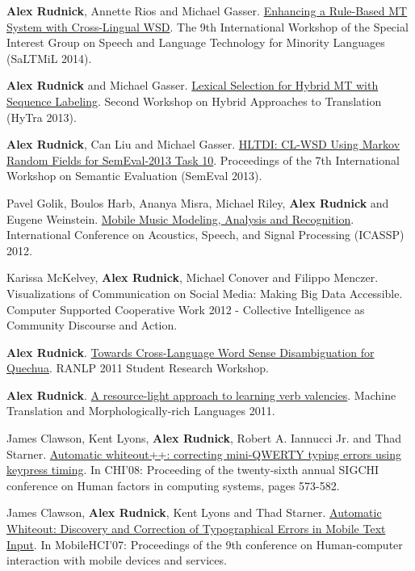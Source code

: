 \begin{itemize*}
\item
\textbf{Alex Rudnick}, Annette Rios and Michael Gasser.
\href{http://www.lrec-conf.org/proceedings/lrec2014/workshops/LREC2014Workshop-SALTMIL\%20Proceedings.pdf}
{Enhancing a Rule-Based MT System with Cross-Lingual WSD}.
The 9th International Workshop of the Special Interest Group on Speech and
Language Technology for Minority Languages (SaLTMiL 2014).

\item
\textbf{Alex Rudnick} and Michael Gasser.
\href{http://www.aclweb.org/anthology/W/W13/W13-2815.pdf}
{Lexical Selection for Hybrid MT with Sequence Labeling}.
Second Workshop on Hybrid Approaches to Translation (HyTra 2013).

\item
\textbf{Alex Rudnick}, Can Liu and Michael Gasser.
\href{http://www.aclweb.org/anthology/S/S13/S13-2031.pdf}
{HLTDI: CL-WSD Using Markov Random Fields for SemEval-2013 Task 10}.
Proceedings of the 7th International Workshop on Semantic Evaluation
(SemEval 2013).

\item
Pavel Golik, Boulos Harb, Ananya Misra, Michael Riley, \textbf{Alex Rudnick}
and Eugene Weinstein.
\href{http://research.google.com/pubs/pub37754.html}
{Mobile Music Modeling, Analysis and Recognition}.
International Conference on Acoustics, Speech, and Signal Processing (ICASSP)
2012.

\item
Karissa McKelvey, \textbf{Alex Rudnick}, Michael Conover and Filippo Menczer.
Visualizations of Communication on Social Media: Making Big Data Accessible.
Computer Supported Cooperative Work 2012 - Collective
Intelligence as Community Discourse and Action.

\item \textbf{Alex Rudnick}.
\href{http://aclweb.org/anthology-new/R/R11/R11-2021.pdf}
{Towards Cross-Language Word Sense Disambiguation for Quechua}.
RANLP 2011 Student Research Workshop.

\item
\textbf{Alex Rudnick}.
\href{http://www.mt-archive.info/MTMRL-2011-Rudnick.pdf}
{A resource-light approach to learning verb valencies}.
Machine Translation and Morphologically-rich Languages 2011.

\item
James Clawson, Kent Lyons, \textbf{Alex Rudnick}, Robert A. Iannucci Jr. and
Thad Starner.
\href{https://alexrudnick.github.io/pubs/automatic-whiteout++_CHI08.pdf}
{Automatic whiteout++: correcting mini-QWERTY typing errors using keypress
timing}.
In CHI'08: Proceeding of the twenty-sixth annual
SIGCHI conference on Human factors in computing systems, pages 573-582.

\item
James Clawson, \textbf{Alex Rudnick}, Kent Lyons and Thad Starner.
\href{https://alexrudnick.github.io/pubs/automatic-whiteout_mobileHCI07.pdf}
{Automatic Whiteout: Discovery and Correction of Typographical Errors in
Mobile Text Input}.
In MobileHCI'07: Proceedings of the 9th conference on
Human-computer interaction with mobile devices and services.
\end{itemize*}


